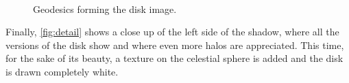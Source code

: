 \begin{figure}[bth]
	\myfloatalign
	 \quad
	 \\
	 \quad
	\caption[Geodesics forming the disk image.]{Geodesics forming the disk image.}\label{fig:geodesicsdisk}
\end{figure}

Finally, \autoref{fig:detail} shows a close up of the left side of the shadow, where all the versions of the disk show and where even more halos are appreciated. This time, for the sake of its beauty, a texture on the celestial sphere is added and the disk is drawn completely white.

